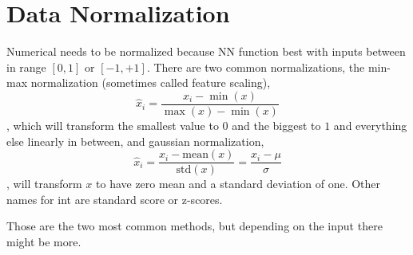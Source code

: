 \section{Data Normalization}\label{sec:data-normalization}

Numerical needs to be normalized because \gls{NN} function best with inputs between in range $[0,1]$ or $[-1,+1]$. There are two common normalizations, the min-max normalization (sometimes called feature scaling),
\begin{equation}\label{eq:min_max_normalization}
\hat x_i = \frac{x_i - \min(x)}{\max(x) - \min(x)}
\end{equation}
, which will transform the smallest value to $0$ and the biggest to $1$ and everything else linearly in between, and gaussian normalization,
\begin{equation}\label{eq:gaussian_normalization}
\hat x_i  = \frac{x_i - \text{mean}(x)}{\text{std}(x)} = \frac{x_i - \mu}{\sigma}
\end{equation}
, will transform $x$ to have zero mean and a standard deviation of one. Other names for int are standard score or z-scores.

Those are the two most common methods, but depending on the input there might be more.